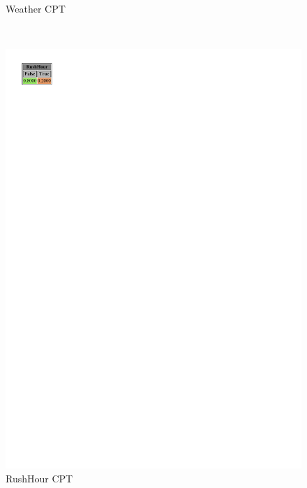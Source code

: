 \documentclass[a4paper,12pt]{article} %
\begin{document}
\begin{figure}[H]
\begin{center}
\begin{minipage}[c]{.3\textwidth}
		\caption*{Weather CPT}
		\label{fig:weather}
	\end{minipage}
	~
	\begin{minipage}[c]{.3\textwidth}
		\centering
		\includegraphics[width=.5\linewidth]{../code/rushhour.pdf}	
		\caption*{RushHour CPT}
		\label{fig:rushhour}
	\end{minipage}


\end{center}
\end{figure}
\end{document}

